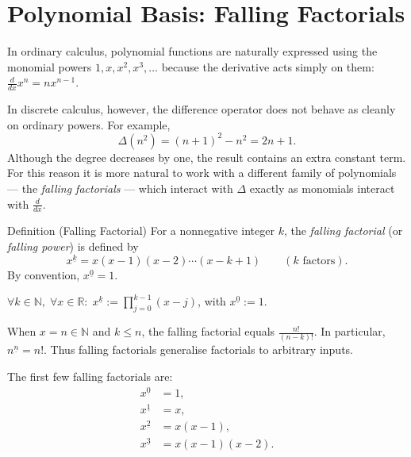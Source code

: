 
\section{Polynomial Basis: Falling Factorials}
\label{sec:falling-factorials}

In ordinary calculus, polynomial functions are naturally expressed using
the monomial powers \(1, x, x^2, x^3, \dots\) because the derivative
acts simply on them: \(\tfrac{d}{dx} x^n = n x^{n-1}\).

In discrete calculus, however, the difference operator does not behave
as cleanly on ordinary powers. For example,
\[
\Delta(n^2) = (n+1)^2 - n^2 = 2n + 1.
\]
Although the degree decreases by one, the result contains an extra
constant term. For this reason it is more natural to work with a
different family of polynomials --- the \emph{falling factorials} ---
which interact with \(\Delta\) exactly as monomials interact with
\(\tfrac{d}{dx}\).

\begin{definitionbox}{Definition (Falling Factorial)}
For a nonnegative integer \(k\), the \emph{falling factorial} (or
\emph{falling power}) is defined by
\[
x^{\underline{k}} = x(x-1)(x-2)\cdots(x-k+1)
\qquad (k \text{ factors}).
\]
By convention, \(x^{\underline{0}} = 1\).
\end{definitionbox}
\label{def:falling-factorial}

\begin{remark*}
\(\forall k \in \mathbb{N},\; \forall x \in \mathbb{R}:\;
x^{\underline{k}} := \displaystyle\prod_{j=0}^{k-1}(x-j)\),
with \(x^{\underline{0}} := 1\).
\end{remark*}

\begin{remark*}
When \(x = n \in \mathbb{N}\) and \(k \le n\), the falling factorial
equals \(\tfrac{n!}{(n-k)!}\). In particular, \(n^{\underline{n}} = n!\).
Thus falling factorials generalise factorials to arbitrary inputs.
\end{remark*}

The first few falling factorials are:
\[
\begin{aligned}
x^{\underline{0}} &= 1, \\
x^{\underline{1}} &= x, \\
x^{\underline{2}} &= x(x-1), \\
x^{\underline{3}} &= x(x-1)(x-2).
\end{aligned}
\]

